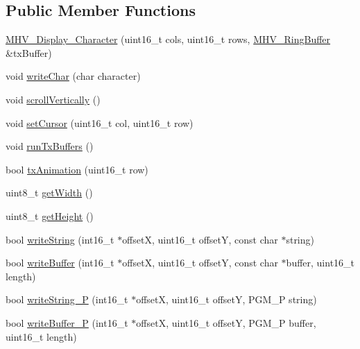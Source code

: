 \subsection*{\-Public \-Member \-Functions}
\begin{DoxyCompactItemize}
\item 
\hyperlink{class_m_h_v___display___character_ab1339d43b1804560e8a3e118b9373506}{\-M\-H\-V\-\_\-\-Display\-\_\-\-Character} (uint16\-\_\-t cols, uint16\-\_\-t rows, \hyperlink{class_m_h_v___ring_buffer}{\-M\-H\-V\-\_\-\-Ring\-Buffer} \&tx\-Buffer)
\item 
void \hyperlink{class_m_h_v___display___character_a9911b577fc34674c794bceccea827384}{write\-Char} (char character)
\item 
void \hyperlink{class_m_h_v___display___character_a1ad8bf055b841a07306a10d68586f8c7}{scroll\-Vertically} ()
\item 
void \hyperlink{class_m_h_v___display___character_a5720ca3afd3127a6a7a3294d22e2ee66}{set\-Cursor} (uint16\-\_\-t col, uint16\-\_\-t row)
\item 
void \hyperlink{class_m_h_v___display___character_ae3cf2037be781199466b44997041ab2a}{run\-Tx\-Buffers} ()
\item 
bool \hyperlink{class_m_h_v___display___character_a6c114f961e9c25d31bbad979908e7a60}{tx\-Animation} (uint16\-\_\-t row)
\item 
uint8\-\_\-t \hyperlink{class_m_h_v___display___character_a1350f77b6d05fdff09e93715adf64785}{get\-Width} ()
\item 
uint8\-\_\-t \hyperlink{class_m_h_v___display___character_a4c7a42da3d0a7b195d7a99f49385fb54}{get\-Height} ()
\item 
bool \hyperlink{class_m_h_v___display___character_a5a5ab3f6e5e5c825347cc09a95bf45de}{write\-String} (int16\-\_\-t $\ast$offset\-X, uint16\-\_\-t offset\-Y, const char $\ast$string)
\item 
bool \hyperlink{class_m_h_v___display___character_aabb66a9900c911ceeee7c9d2820543dc}{write\-Buffer} (int16\-\_\-t $\ast$offset\-X, uint16\-\_\-t offset\-Y, const char $\ast$buffer, uint16\-\_\-t length)
\item 
bool \hyperlink{class_m_h_v___display___character_ab326db62411867434bdc769340672727}{write\-String\-\_\-\-P} (int16\-\_\-t $\ast$offset\-X, uint16\-\_\-t offset\-Y, \-P\-G\-M\-\_\-\-P string)
\item 
bool \hyperlink{class_m_h_v___display___character_a50c07885a440f5092c21b0d602ca5007}{write\-Buffer\-\_\-\-P} (int16\-\_\-t $\ast$offset\-X, uint16\-\_\-t offset\-Y, \-P\-G\-M\-\_\-\-P buffer, uint16\-\_\-t length)

\end{DoxyCompactItemize}
